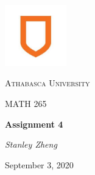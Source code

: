 \documentclass[11pt, letterpaper, twoside]{article}
\begin{document}
\begin{titlepage}
\centering
\vspace*{60px}
\hspace{0pt}
\includegraphics[width=0.2\textwidth]{logo}\par\vspace{1cm}
{\scshape\LARGE Athabasca University \par}
\vspace{1cm}
{\scshape\Large MATH 265\par}
\vspace{1.5cm}
{\huge\bfseries Assignment 4\par}
\vspace{2cm}
{\Large\itshape Stanley Zheng\par}
\vfill
{\large September 3, 2020\par}
\vspace*{50px}
\hspace{0pt}
\pagebreak
\end{titlepage}
\end{document}

